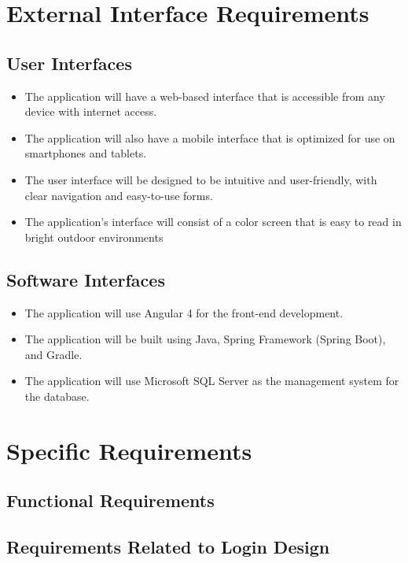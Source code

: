 \documentclass[12pt]{article}
\begin{document}
\section{External Interface Requirements}
\subsection{User Interfaces}
\begin{itemize}
     \item The application will have a web-based interface that is accessible from any device with internet access.
     \item The application will also have a mobile interface that is optimized for use on smartphones and tablets.
     \item The user interface will be designed to be intuitive and user-friendly, with clear navigation and easy-to-use forms.
     \item The application's interface will consist of a color screen that is easy to read in bright outdoor environments
\end{itemize}
\subsection{Software Interfaces}
\begin{itemize}
     \item The application will use Angular 4 for the front-end development.
     \item The application will be built using Java, Spring Framework (Spring Boot), and Gradle.
     \item The application will use Microsoft SQL Server as the management system for the database.
\end{itemize}
\newpage

\section{Specific Requirements}

\subsection{Functional Requirements}

\subsection{Requirements Related to Login Design}
\end{document}
